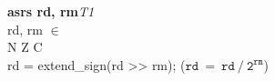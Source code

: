 


\begin{instructionblock}{\imagewidth}%
    \textbf{asrs rd, rm}\hfill\textit{T1}\\
    rd, rm $\in$ \baseregisters\\
    {N Z C}\\
    rd = extend\_sign(rd {>}{>} rm);
    ($\mathtt{rd\ =\ rd\ /\ 2^{rm}}$)
\end{instructionblock}

